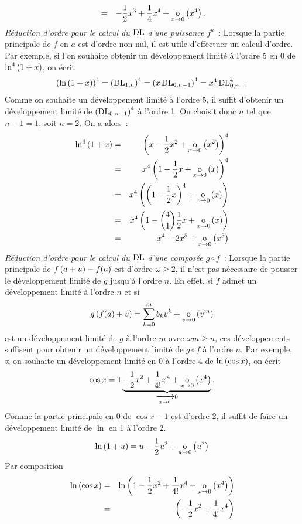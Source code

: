\documentclass{magnoliaold}
\begin{document}
\begin{remarques}
\begin{eqnarray*}
    &=& -\frac{1}{2}x^3+\frac{1}{4}x^4+\underset{x \rightarrow 0}{\text{o}}\left(x^4\right).
    \end{eqnarray*}
    \remarque \textit{Réduction d'ordre pour le calcul du $\operatorname{DL}$ d'une puissance $f^k$}~:
    Lorsque la partie principale de $f$ en $a$ est d'ordre non nul, il est
      utile d'effectuer un calcul d'ordre. Par exemple, si
      l'on souhaite obtenir un développement limité à l'ordre 5 en 0 de
      $\ln^4\left(1+x\right)$, on écrit
      \[\left(\ln\left(1+x\right)\right)^4=\left(\operatorname{DL}_{1,n}\right)^4=\left(x\operatorname{DL}_{0,n-1}\right)^4=x^4\operatorname{DL}_{0,n-1}^4\]
      Comme on souhaite un développement limité à l'ordre 5, il suffit
      d'obtenir un développement limité de $\left(\operatorname{DL}_{0,n-1}\right)^4$ à l'ordre 1.
      On choisit donc $n$ tel que $n-1=1$, soit $n=2$. On a alors~:
      \begin{eqnarray*}
      \ln^4\left(1+x\right)
      &=& \left(x-\frac{1}{2}x^2+\underset{x \rightarrow 0}{\text{o}}\left(x^2\right)\right)^4\\
      &=& x^4\left(1-\frac{1}{2}x+\underset{x \rightarrow 0}{\text{o}}\left(x\right)\right)^4\\
      &=& x^4\left(\left(1-\frac{1}{2}x\right)^4+\underset{x \rightarrow 0}{\text{o}}\left(x\right)\right)\\
      &=& x^4\left(1-\binom{4}{1}\frac{1}{2}x+\underset{x \rightarrow 0}{\text{o}}\left(x\right)\right)\\
      &=& x^4-2x^5+\underset{x \rightarrow 0}{\text{o}}\left(x^5\right)
      \end{eqnarray*}   
      \remarque \textit{Réduction d'ordre pour le calcul du $\operatorname{DL}$ d'une composée $g\circ f$}~:
      Lorsque la partie principale de $f\left(a+u\right)-f(a)$ est d'ordre $\omega\geq 2$, il n'est pas nécessaire de pousser le développement limité de $g$ jusqu'à l'ordre $n$. En effet, si $f$ admet un développement limité à l'ordre $n$ et si
      \[g\left(f(a)+v\right)=\sum_{k=0}^m b_k v^k+\underset{v \rightarrow 0}{\text{o}}\left(v^m\right)\]
      est un développement limité de $g$ à l'ordre $m$ avec $\omega m\geq n$, ces développements suffisent pour obtenir un développement limité de $g\circ f$ à l'ordre $n$. Par
        exemple, si on souhaite un développement limité en 0 à l'ordre 4 de
        $\ln\left(\cos x\right)$, on écrit
        \[\cos x=1\underbrace{-\frac{1}{2}x^2+\frac{1}{4!}x^4+\petitozero{x}{x^4}}_%
          {\tendvers{x}{0}0}.\]
        Comme la partie principale en $0$ de $\cos x-1$ est d'ordre 2, il suffit de
        faire un développement limité de $\ln$ en 1 à l'ordre $2$.
        \[\ln\left(1+u\right)=u-\frac{1}{2}u^2+\underset{u \rightarrow 0}{\text{o}}\left(u^2\right)\]
        Par composition
        \begin{eqnarray*}
        \ln\p{\cos x}
        &=& \ln\p{1-\frac{1}{2}x^2+\frac{1}{4!}x^4+\petitozero{x}{x^4}}\\
        &=& \p{-\frac{1}{2}x^2+\frac{1}{4!}x^4}

\end{eqnarray*}
\end{remarques}
\end{document}
